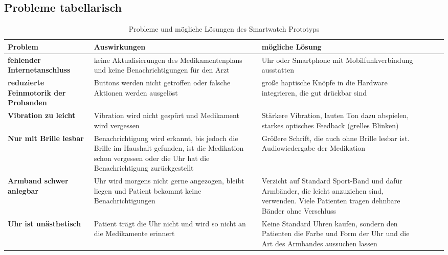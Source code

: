 \subsection{Probleme tabellarisch}
\begin{table}[]
\centering
\caption{Probleme und mögliche Lösungen des Smartwatch Prototyps}
\label{my-label}
\begin{tabular}{p{4cm} p{5cm} p{5cm}|l|l|l|}
\hline
 Problem  &Auswirkungen  &mögliche Lösung  \\ \hline
 \textbf{fehlender Internetanschluss}  &keine Aktualisierungen des Medikamentenplans und keine Benachrichtigungen für den Arzt &Uhr oder Smartphone mit Mobilfunkverbindung ausstatten  \\
 \textbf{reduzierte Feinmotorik der Probanden} &Buttons werden nicht getroffen oder falsche Aktionen werden ausgelöst  &große haptische Knöpfe in die Hardware integrieren, die gut drückbar sind  \\
 \textbf{Vibration zu leicht}&Vibration wird nicht gespürt und Medikament wird vergessen  &Stärkere Vibration, lauten Ton dazu abspielen, starkes optisches Feedback (grelles Blinken)   \\
 \textbf{Nur mit Brille lesbar} &Benachrichtigung wird erkannt, bis jedoch die Brille im Haushalt gefunden, ist die Medikation schon vergessen oder die Uhr hat die Benachrichtigung zurückgestellt  &Größere Schrift, die auch ohne Brille lesbar ist. Audiowiedergabe der Medikation  \\
 \textbf{Armband schwer anlegbar}&Uhr wird morgens nicht gerne angezogen,  bleibt liegen und Patient bekommt keine Benachrichtigungen  &Verzicht auf Standard Sport-Band und dafür Armbänder, die leicht anzuziehen sind, verwenden. Viele Patienten tragen dehnbare Bänder ohne Verschluss \\
 \textbf{Uhr ist unästhetisch}&Patient trägt die Uhr nicht und wird so nicht an die Medikamente erinnert  &Keine Standard Uhren kaufen, sondern den Patienten die Farbe und Form der Uhr und die Art des Armbandes aussuchen lassen  \\ \hline
\end{tabular}
\end{table}

